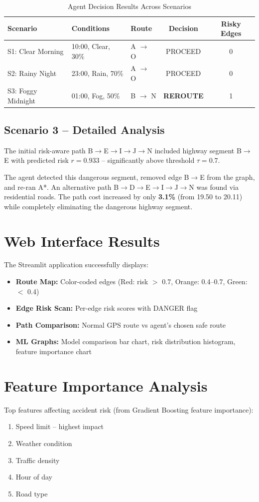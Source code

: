 \documentclass[12pt,a4paper]{report}
\begin{document}
\begin{table}[h!]
\centering
\caption{Agent Decision Results Across Scenarios}
\begin{tabular}{lllcc}
\toprule
\textbf{Scenario} & \textbf{Conditions} & \textbf{Route} & \textbf{Decision} & \textbf{Risky Edges} \\
\midrule
S1: Clear Morning & 10:00, Clear, 30\% & A $\to$ O & PROCEED & 0 \\
S2: Rainy Night & 23:00, Rain, 70\% & A $\to$ O & PROCEED & 0 \\
S3: Foggy Midnight & 01:00, Fog, 50\% & B $\to$ N & \textbf{REROUTE} & 1 \\
\bottomrule
\end{tabular}
\end{table}

\subsection{Scenario 3 -- Detailed Analysis}
The initial risk-aware path B$\to$E$\to$I$\to$J$\to$N included highway segment B$\to$E with predicted risk $r = 0.933$ -- significantly above threshold $\tau = 0.7$.

The agent detected this dangerous segment, removed edge B$\to$E from the graph, and re-ran A*. An alternative path B$\to$D$\to$E$\to$I$\to$J$\to$N was found via residential roads. The path cost increased by only \textbf{3.1\%} (from 19.50 to 20.11) while completely eliminating the dangerous highway segment.

\section{Web Interface Results}
The Streamlit application successfully displays:
\begin{itemize}
  \item \textbf{Route Map:} Color-coded edges (Red: risk $>$ 0.7, Orange: 0.4--0.7, Green: $<$ 0.4)
  \item \textbf{Edge Risk Scan:} Per-edge risk scores with DANGER flag
  \item \textbf{Path Comparison:} Normal GPS route vs agent's chosen safe route
  \item \textbf{ML Graphs:} Model comparison bar chart, risk distribution histogram, feature importance chart
\end{itemize}

\section{Feature Importance Analysis}
Top features affecting accident risk (from Gradient Boosting feature importance):
\begin{enumerate}
  \item Speed limit -- highest impact
  \item Weather condition
  \item Traffic density
  \item Hour of day
  \item Road type
\end{enumerate}
\end{document}
